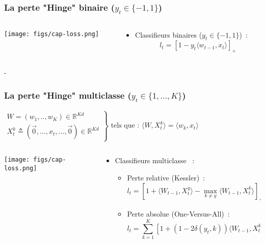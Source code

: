 \documentclass{beamer}
\begin{document}
\begin{frame}
	\frametitle{La perte "Hinge" binaire ($y_t \in \{-1,1\}$)}
	\begin{columns}
		\begin{column}{.2 \linewidth}
			\centerline{\texttt{[image: figs/cap-loss.png]}}
		\end{column}
		\begin{column}{.8 \linewidth}
			\begin{itemize}
				\item Classifieurs binaires ($y_t \in \{-1,1\}$)~:
				$$ l_t = \left[1 - y_t \langle w_{t-1}, x_t \rangle \right]_+$$
			
			\end{itemize}
		\end{column}		
	\end{columns}
-\end{frame}

\begin{frame}
	\frametitle{La perte "Hinge" multiclasse ($y_t \in \{1,...,K\}$)}
		\begin{exampleblock}{}
			$
			\left.
			\begin{array}{l}
			W = (w_1,..,w_K) \in \mathbb{R}^{K d}\\
			X_t^k \triangleq (\vec{0}, ...,  x_t, ..., \vec{0}) \in \mathbb{R}^{K d}
			\end{array}
			\right\}
			\text{ tels que : }
			\langle W, X^k_t\rangle = \langle w_k, x_t\rangle
			$
			
		\end{exampleblock}
		
	\begin{columns}
		\begin{column}{.2 \linewidth}
			\centerline{\texttt{[image: figs/cap-loss.png]}}
		\end{column}
		\begin{column}{.8 \linewidth}
			\begin{itemize}
				\item Classifieurs multiclasse ~:
				\begin{itemize}
					\item Perte relative (Kessler)~:
					$$l_t =  \left[ 1 +  \langle W_{t-1}, X_t^y \rangle - \max_{k \neq y} \langle W_{t-1}, X_t^k\rangle\right]_+$$
					\item Perte absolue (One-Versus-All)~:
					$$l_t = \sum_{k=1}^K \left[1 + (1 - 2 \delta(y_t,k)) \langle W_{t-1}, X_t^k\rangle\right]_+$$
					
				\end{itemize}
			\end{itemize}
		\end{column}		
	\end{columns}
\end{frame}
\end{document}
